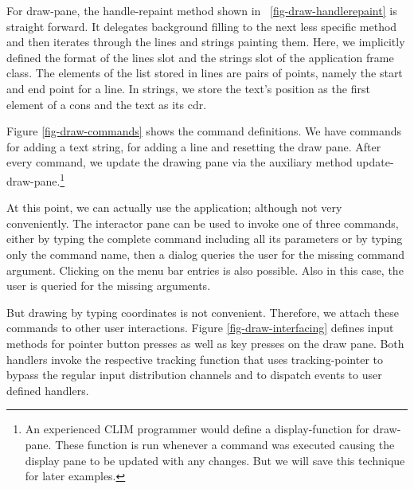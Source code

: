 \documentclass[twocolumn,a4paper]{article}
\newcommand {\code}[1]{{\sffamily #1}}
\newcommand {\CLIM}{{\small CLIM}}
\let\class\code
\let\method\code
\let\constant\code
\let\macro\code
\let\keyword\code
\begin{document}
For \class{draw-pane}, the \method{handle-repaint} method shown in \figurename~\ref{fig-draw-handlerepaint} is straight forward. It delegates background filling to the next less specific method and then iterates through the lines and strings painting them. Here, we implicitly defined the format of the \code{lines} slot and the \code{strings} slot of the application frame class. The elements of the list stored in \code{lines} are pairs of points, namely the start and end point for a line. In \code{strings}, we store the text's position as the first element of a cons and the text as its cdr.



Figure \ref{fig-draw-commands} shows the command definitions. We have commands for adding a text string, for adding a line and resetting the draw pane. After every command, we update the drawing pane via the auxiliary method \method{update-draw-pane}.\footnote{An experienced \CLIM{} programmer would define a display-function for \class{draw-pane}. These function is run whenever a command was executed causing the display pane to be updated with any changes. But we will save this technique for later examples.}

At this point, we can actually use the application; although not very conveniently. The interactor pane can be used to invoke one of three commands, either by typing the complete command including all its parameters or by typing only the command name, then a dialog queries the user for the missing command argument. Clicking on the menu bar entries is also possible. Also in this case, the user is queried for the missing arguments.

But drawing by typing coordinates is not convenient. Therefore, we attach these commands to other user interactions.   Figure \ref{fig-draw-interfacing} defines input methods for pointer button presses as well as key presses on the draw pane. Both handlers invoke the respective tracking function that uses \macro{tracking-pointer} to bypass the regular input distribution channels and to dispatch events to user defined handlers.
\end{document}
